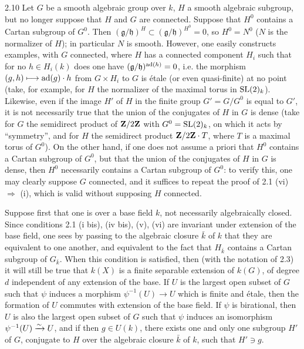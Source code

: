 \begin{remarks}{2.10}\label{XIII.2.10}
Let $G$ be a smooth algebraic group over $k$, $H$ a smooth algebraic
subgroup, but no longer suppose that $H$ and $G$ are connected. Suppose
that $H^0$ contains a Cartan subgroup of $G^0$. Then
$(\mathfrak g/\mathfrak h)^H\subset(\mathfrak g/\mathfrak h)^{H^0}=0$,
so $H^0=N^0$ ($N$ is the normalizer of $H$); in particular $N$ is smooth.
However, one easily constructs examples, with $G$ connected, where $H$
has a connected component $H_i$ such that for no $h\in H_i(k)$ does
one have $(\mathfrak g/\mathfrak h)^{\operatorname{ad}(h)}=0$, i.e. the morphism
$(g,h)\longmapsto\operatorname{ad}(g)\cdot h$ from $G\times H_i$ to $G$ is \'etale
(or even quasi-finite) at no point (take, for example, for $H$ the
normalizer of the maximal torus in $\operatorname{SL}(2)_k$). Likewise, even if the
image $H'$ of $H$ in the finite group $G'=G/G^0$ is equal to $G'$, it
is not necessarily true that the union of the conjugates of $H$ in
$G$ is dense (take for $G$ the semidirect product of $\mathbf{Z}/2\mathbf{Z}$ with
$G^0=\operatorname{SL}(2)_k$, on which it acts by ``symmetry'', and for $H$ the
semidirect product $\mathbf{Z}/2\mathbf{Z}\cdot T$, where $T$ is a maximal torus
of $G^0$). On the other hand, if one does not assume a priori that
$H^0$ contains a Cartan subgroup of $G^0$, but that the union of the
conjugates of $H$ in $G$ is dense, then $H^0$ necessarily contains a
Cartan subgroup of $G^0$: to verify this, one may clearly suppose
$G$ connected, and it suffices to repeat the proof of 2.1 (vi)
$\Rightarrow$ (i), which is valid without supposing $H$ connected.
\end{remarks}

Suppose first that one is over a base field $k$, not necessarily
algebraically closed. Since conditions 2.1 (i bis), (iv bis), (v),
(vi) are invariant under extension of the base field, one sees by
passing to the algebraic closure $\bar k$ of $k$ that they are equivalent
to one another, and equivalent to the fact that $H_{\bar k}$ contains
a Cartan subgroup of $G_{\bar k}$. When this condition is satisfied,
then (with the notation of 2.3) it will still be true that $k(X)$ is
a finite separable extension of $k(G)$, of degree $d$ independent of
any extension of the base. If $U$ is the largest open subset of $G$
such that $\psi$ induces a morphism $\psi^{-1}(U)\to U$ which is finite
and \'etale, then the formation of $U$ commutes with extension of the
base field. If $\psi$ is birational, then $U$ is also the largest open
subset of $G$ such that $\psi$ induces an isomorphism
$\psi^{-1}(U)\xrightarrow{\sim} U$, and if then $g\in U(k)$, there exists one and
only one subgroup $H'$ of $G$, conjugate to $H$ over the algebraic
closure $\bar k$ of $k$, such that $H'\ni g$.

